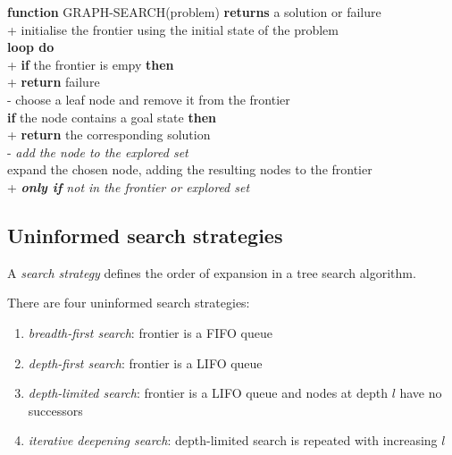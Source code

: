 \documentclass{article}
\begin{document}
\begin{pseudo}
\textbf{function} GRAPH-SEARCH(problem) \textbf{returns} a solution or failure  \\+
    initialise the frontier using the initial state of the problem              \\
    \textbf{loop do}                                                            \\+
        \textbf{if} the frontier is empy \textbf{then}                          \\+
            \textbf{return} failure                                             \\-
        choose a leaf node and remove it from the frontier                      \\
        \textbf{if} the node contains a goal state \textbf{then}                \\+
            \textbf{return} the corresponding solution                          \\-
        \emph{add the node to the explored set}                                 \\
        expand the chosen node, adding the resulting nodes to the frontier      \\+
            \emph{\textbf{only if} not in the frontier or explored set}
\end{pseudo}



\subsection{Uninformed search strategies}

\begin{definition}
    A \emph{search strategy} defines the order of expansion in a tree search algorithm.
\end{definition}

\begin{definition}
    There are four uninformed search strategies:
    \begin{enumerate}
        \item \emph{breadth-first search}: frontier is a FIFO queue
        \item \emph{depth-first search}: frontier is a LIFO queue
        \item \emph{depth-limited search}: frontier is a LIFO queue and nodes at depth $l$ have no successors
        \item \emph{iterative deepening search}: depth-limited search is repeated with increasing $l$
    \end{enumerate}
\end{definition}
\end{document}
